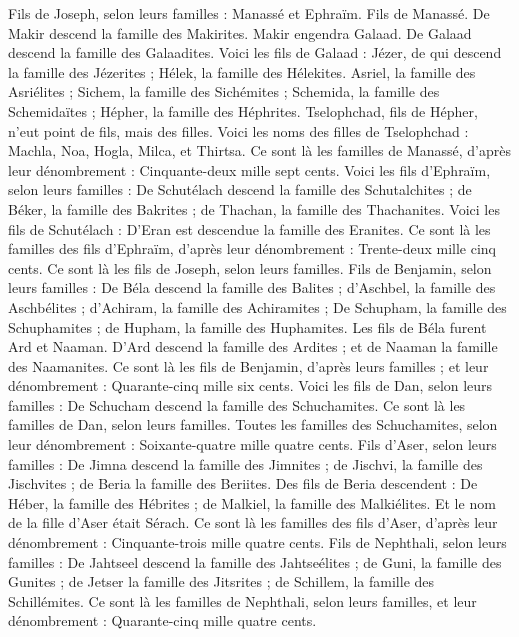 \begin{multicols}{2}
Fils de Joseph, selon leurs familles : Manassé et Ephraïm.
Fils de Manassé. De Makir descend la famille des Makirites. Makir engendra Galaad. De Galaad descend la famille des Galaadites.
Voici les fils de Galaad : Jézer, de qui descend la famille des Jézerites ; Hélek, la famille des Hélekites.
Asriel, la famille des Asriélites ; Sichem, la famille des Sichémites ;
Schemida, la famille des Schemidaïtes ; Hépher, la famille des Héphrites.
Tselophchad, fils de Hépher, n'eut point de fils, mais des filles. Voici les noms des filles de Tselophchad : Machla, Noa, Hogla, Milca, et Thirtsa.
Ce sont là les familles de Manassé, d'après leur dénombrement : Cinquante-deux mille sept cents.
Voici les fils d'Ephraïm, selon leurs familles : De Schutélach descend la famille des Schutalchites ; de Béker, la famille des Bakrites ; de Thachan, la famille des Thachanites.
Voici les fils de Schutélach : D'Eran est descendue la famille des Eranites.
Ce sont là les familles des fils d'Ephraïm, d'après leur dénombrement : Trente-deux mille cinq cents. Ce sont là les fils de Joseph, selon leurs familles.
Fils de Benjamin, selon leurs familles : De Béla descend la famille des Balites ; d'Aschbel, la famille des Aschbélites ; d'Achiram, la famille des Achiramites ;
De Schupham, la famille des Schuphamites ; de Hupham, la famille des Huphamites.
Les fils de Béla furent Ard et Naaman. D'Ard descend la famille des Ardites ; et de Naaman la famille des Naamanites.
Ce sont là les fils de Benjamin, d'après leurs familles ; et leur dénombrement : Quarante-cinq mille six cents.
Voici les fils de Dan, selon leurs familles : De Schucham descend la famille des Schuchamites. Ce sont là les familles de Dan, selon leurs familles.
Toutes les familles des Schuchamites, selon leur dénombrement : Soixante-quatre mille quatre cents.
Fils d'Aser, selon leurs familles : De Jimna descend la famille des Jimnites ; de Jischvi, la famille des Jischvites ; de Beria la famille des Beriites.
Des fils de Beria descendent : De Héber, la famille des Hébrites ; de Malkiel, la famille des Malkiélites.
Et le nom de la fille d'Aser était Sérach.
Ce sont là les familles des fils d'Aser, d'après leur dénombrement : Cinquante-trois mille quatre cents.
Fils de Nephthali, selon leurs familles : De Jahtseel descend la famille des Jahtseélites ; de Guni, la famille des Gunites ;
de Jetser la famille des Jitsrites ; de Schillem, la famille des Schillémites.
Ce sont là les familles de Nephthali, selon leurs familles, et leur dénombrement : Quarante-cinq mille quatre cents.

\end{multicols}
